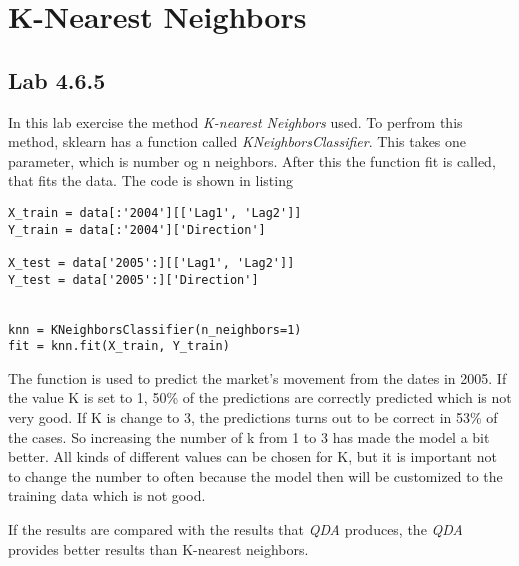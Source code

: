 \section{K-Nearest Neighbors}

\subsection{Lab 4.6.5}

In this lab exercise the method \emph{K-nearest Neighbors} used. To perfrom this method, sklearn has a function called \emph{KNeighborsClassifier}. This takes one parameter, which is number og n neighbors. After this the function fit is called, that fits the data.
The code is shown in listing

\begin{lstlisting}[caption={Python K-Nearest neighbors function, where K is set to 1}, label=lst:kneighbor, mathescape=true]
X_train = data[:'2004'][['Lag1', 'Lag2']]
Y_train = data[:'2004']['Direction']

X_test = data['2005':][['Lag1', 'Lag2']]
Y_test = data['2005':]['Direction']


knn = KNeighborsClassifier(n_neighbors=1)
fit = knn.fit(X_train, Y_train)
\end{lstlisting}

The function is used to predict the market's movement from the dates in 2005. If the value K is set to 1, 50\% of the predictions are correctly predicted which is not very good.
If K is change to 3, the predictions turns out to be correct in 53\% of the cases. So increasing the number of k from 1 to 3 has made the model a bit better. All kinds of different values can be chosen for K, but it is important not to change the number to often because the model then will be customized to the training data which is not good.

If the results are compared with the results that \emph{QDA} produces, the \emph{QDA} provides better results than K-nearest neighbors.



